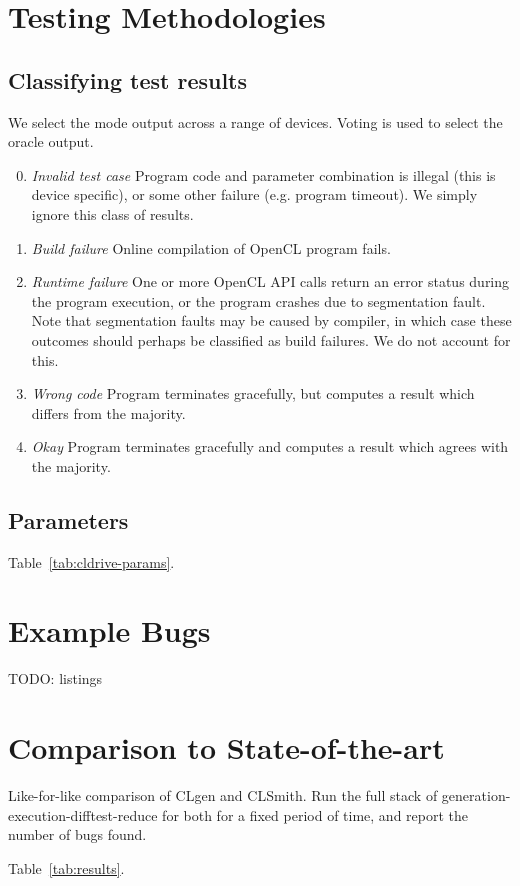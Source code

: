 \section{Testing Methodologies}\label{sec:methodology}


\subsection{Classifying test results}

We select the mode output across a range of devices. Voting is used to select the oracle output.
%
\begin{enumerate}
	\setcounter{enumi}{-1}
	\item \emph{Invalid test case} Program code and parameter combination is illegal (this is device specific), or some other failure (e.g. program timeout). We simply ignore this class of results.
	\item \emph{Build failure} Online compilation of OpenCL program fails.
	\item \emph{Runtime failure} One or more OpenCL API calls return an error status during the program execution, or the program crashes due to segmentation fault. Note that segmentation faults may be caused by compiler, in which case these outcomes should perhaps be classified as build failures. We do not account for this.
	\item \emph{Wrong code} Program terminates gracefully, but computes a result which differs from the majority.
	\item \emph{Okay} Program terminates gracefully and computes a result which agrees with the majority.
\end{enumerate}


\subsection{Parameters}

Table~\ref{tab:cldrive-params}. 


\section{Example Bugs}

TODO: listings


\section{Comparison to State-of-the-art}

Like-for-like comparison of CLgen and CLSmith. Run the full stack of generation-execution-difftest-reduce for both for a fixed period of time, and report the number of bugs found.

Table~\ref{tab:results}.


